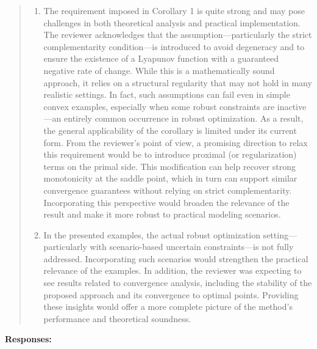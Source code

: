 \documentclass[journal,twoside,web]{ieeecolor}
\begin{document}
\begin{quote}
\begin{enumerate}
\item The requirement imposed in Corollary 1 is quite strong and may pose challenges in both theoretical analysis and practical implementation. The reviewer acknowledges that the assumption—particularly the strict complementarity condition—is introduced to avoid degeneracy and to ensure the existence of a Lyapunov function with a guaranteed negative rate of change. While this is a mathematically sound approach, it relies on a structural regularity that may not hold in many realistic settings. In fact, such assumptions can fail even in simple convex examples, especially when some robust constraints are inactive—an entirely common occurrence in robust optimization. As a result, the general applicability of the corollary is limited under its current form. From the reviewer's point of view, a promising direction to relax this requirement would be to introduce proximal (or regularization) terms on the primal side. This modification can help recover strong monotonicity at the saddle point, which in turn can support similar convergence guarantees without relying on strict complementarity. Incorporating this perspective would broaden the relevance of the result and make it more robust to practical modeling scenarios.

\item In the presented examples, the actual robust optimization setting—particularly with scenario-based uncertain constraints—is not fully addressed. Incorporating such scenarios would strengthen the practical relevance of the examples. In addition, the reviewer was expecting to see results related to convergence analysis, including the stability of the proposed approach and its convergence to optimal points. Providing these insights would offer a more complete picture of the method's performance and theoretical soundness.
\end{enumerate}
\end{quote}

\newpage

\noindent\textbf{Responses:}
\end{document}
